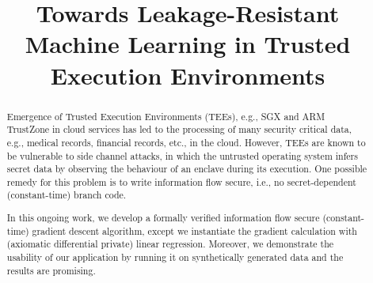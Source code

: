 \documentclass[sigplan,screen]{acmart}
\begin{document}
\title{Towards Leakage-Resistant Machine Learning in Trusted Execution Environments}









\begin{abstract}
    

  Emergence of Trusted Execution Environments (TEEs), e.g., SGX and ARM TrustZone 
  in cloud services has led to the processing of 
  many security critical data, e.g., medical records, financial records, etc., 
  in the cloud. However, TEEs are known to be vulnerable to side
  channel attacks, in which the untrusted operating system infers 
  secret data by observing the behaviour of an enclave during its execution. 
  One possible remedy for this problem is to write information flow secure,
  i.e., no secret-dependent (constant-time) branch code.
  
  In this ongoing work, we develop a formally verified information flow secure (constant-time)
  gradient descent algorithm,  
  except we instantiate the gradient calculation with (axiomatic differential 
  private) linear regression. 
  Moreover, we demonstrate the usability of our application by running it on 
  synthetically generated data and the results are promising.
  
\end{abstract}
\end{document}

